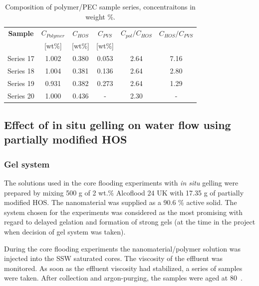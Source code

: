 \documentclass[nanomaterials,article,submit,moreauthors,pdftex]{Definitions/mdpi}
\begin{document}
\begin{table}[h!] 

\centering
\caption{Composition of polymer/PEC sample series, concentraitons in weight \%.}
\label{tab:polyPecComp}
\begin{tabular}{c c c c c c } 
\toprule
\textbf{Sample} & \textbf{$C_{Polymer}$} & \textbf{$C_{HOS}$} & \textbf{$C_{PVS}$} & \textbf{$C_{pol}/C_{HOS}$} & \textbf{$C_{HOS}/C_{PVS}$} \\ 
&[wt\%]& [wt\%] & [wt\%] && \\
\midrule 
Series 17   & 1.002   & 0.380 & 0.053 & 2.64 & 7.16\\
Series 18   & 1.004   & 0.381 & 0.136 & 2.64 & 2.80\\ 
Series 19   & 0.931   & 0.382 & 0.273 & 2.64 & 1.29\\ 
Series 20   & 1.000   & 0.436 & - & 2.30     & - \\
\bottomrule
\end{tabular}
\end{table}

\subsection{Effect of in situ gelling on water flow using partially modified HOS \label{sec:lactamide}}
\subsubsection{Gel system}
The solutions used in the core flooding experiments with \textit{in situ} gelling were prepared by mixing 500 g of 2 wt.\% Alcoflood 24 UK with 17.35 g of partially modified HOS. The nanomaterial was supplied as a 90.6 \% active solid. The system chosen for the experiments was considered as the most promising with regard to delayed gelation and formation of strong gels (at the time in the project when decision of gel system was taken).

During the core flooding experiments the nanomaterial/polymer solution was injected into the SSW saturated cores. The viscosity of the effluent was monitored. As soon as the effluent viscosity had stabilized, a series of samples were taken. After collection and argon-purging, the samples were aged at 80~\celsius. 
\end{document}
